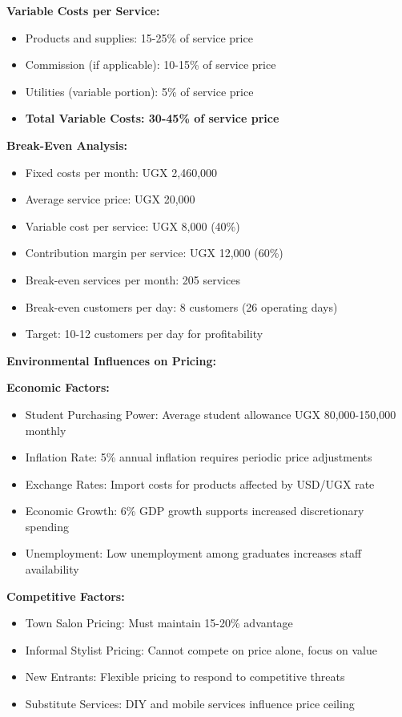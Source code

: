 \documentclass[a4paper,12pt]{article}
\begin{document}
\textbf{Variable Costs per Service:}
\begin{itemize}[leftmargin=2em]
    \item Products and supplies: 15-25\% of service price
    \item Commission (if applicable): 10-15\% of service price
    \item Utilities (variable portion): 5\% of service price
    \item \textbf{Total Variable Costs: 30-45\% of service price}
\end{itemize}

\textbf{Break-Even Analysis:}
\begin{itemize}[leftmargin=2em]
    \item Fixed costs per month: UGX 2,460,000
    \item Average service price: UGX 20,000
    \item Variable cost per service: UGX 8,000 (40\%)
    \item Contribution margin per service: UGX 12,000 (60\%)
    \item Break-even services per month: 205 services
    \item Break-even customers per day: 8 customers (26 operating days)
    \item Target: 10-12 customers per day for profitability
\end{itemize}

\vspace{1em}

\textbf{Environmental Influences on Pricing:}

\textbf{Economic Factors:}
\begin{itemize}[leftmargin=2em]
    \item Student Purchasing Power: Average student allowance UGX 80,000-150,000 monthly
    \item Inflation Rate: 5\% annual inflation requires periodic price adjustments
    \item Exchange Rates: Import costs for products affected by USD/UGX rate
    \item Economic Growth: 6\% GDP growth supports increased discretionary spending
    \item Unemployment: Low unemployment among graduates increases staff availability
\end{itemize}

\textbf{Competitive Factors:}
\begin{itemize}[leftmargin=2em]
    \item Town Salon Pricing: Must maintain 15-20\% advantage
    \item Informal Stylist Pricing: Cannot compete on price alone, focus on value
    \item New Entrants: Flexible pricing to respond to competitive threats
    \item Substitute Services: DIY and mobile services influence price ceiling
\end{itemize}
\end{document}
